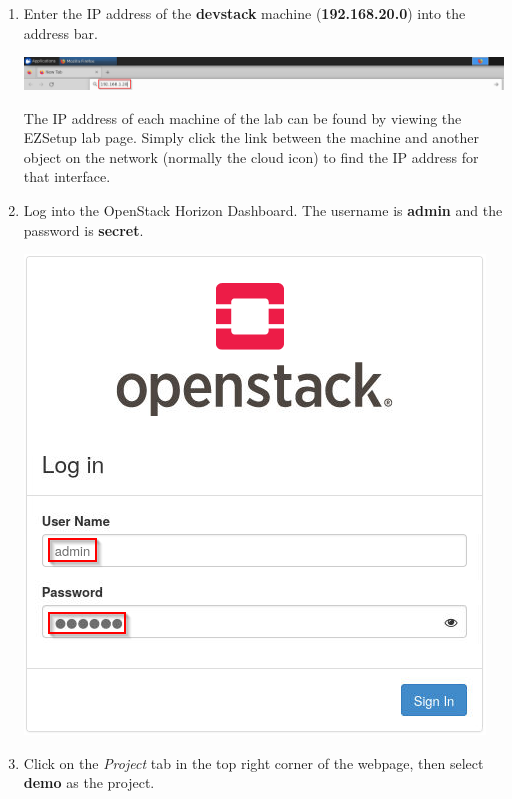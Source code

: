 \documentclass[letterpaper, 12pt]{article}
\begin{document}
\begin{enumerate}
    \item Enter the IP address of the \textbf{devstack} machine (\textbf{192.168.20.0}) into the address bar.
    
    \begin{center}
        \includegraphics[width=\linewidth]{images/part1/step6.png}
    \end{center}

    \begin{tipbox}{}
        The IP address of each machine of the lab can be found by viewing the EZSetup lab page. Simply click the link
        between the machine and another object on the network (normally the cloud icon) to find the IP address for that
        interface.
    \end{tipbox}

    \item Log into the OpenStack Horizon Dashboard. The username is \textbf{admin} and the password is \textbf{secret}.
    
    \begin{center}
        \includegraphics[scale=0.75]{images/part1/step7.png}
    \end{center}

    \item Click on the \textit{Project} tab in the top right corner of the webpage, then select \textbf{demo} as the
    project.


\end{enumerate}
\end{document}
